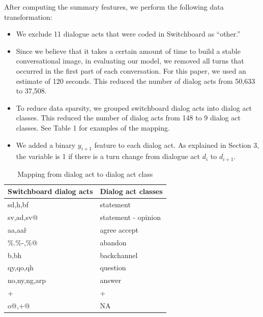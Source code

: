    After computing the summary features, we perform the following data transformation:
    \begin{itemize}[leftmargin=1em]
    \item We exclude 11 dialogue acts that were coded in Switchboard as ``other.''
    \item Since we believe that it takes a certain amount of time to build a stable conversational image, in evaluating our model, we removed all turns that occurred in the first part of each conversation. For this paper, we used an estimate of 120 seconds. This reduced the number of dialog acts from 50,633 to 37,508.
    \item To reduce data sparsity, we grouped switchboard dialog acts into dialog act classes. This reduced the number of dialog acts from 148 to 9 dialog act classes. See Table 1 for examples of the mapping.
    \item We added a binary $y_{i+1}$ feature to each dialog act. As explained in Section 3, the variable is 1 if there is a turn change from dialogue act $d_i$ to $d_{i+1}$.

    \end{itemize}
    \begin{table}
     \begin{center}
    \begin{tabular}{ |p{2cm}||p{3cm} | }
    \hline
Switchboard dialog acts &  Dialog act classes  \\
    \hline
sd,h,bf      & statement   \\
sv,ad,sv@    & statement - opinion  \\
aa,aa\^r     & agree accept \\
\%.\%-,\%@   & abandon      \\
b,bh         & backchannel  \\
qy,qo,qh     & question     \\
no,ny,ng,arp & answer       \\
+            & +            \\
o@,+@        & NA           \\
  \hline
\end{tabular}
\end{center}\vspace{-0.5em}
\caption{Mapping from dialog act to dialog act class}
\label{tab:mapping}
\end{table}
